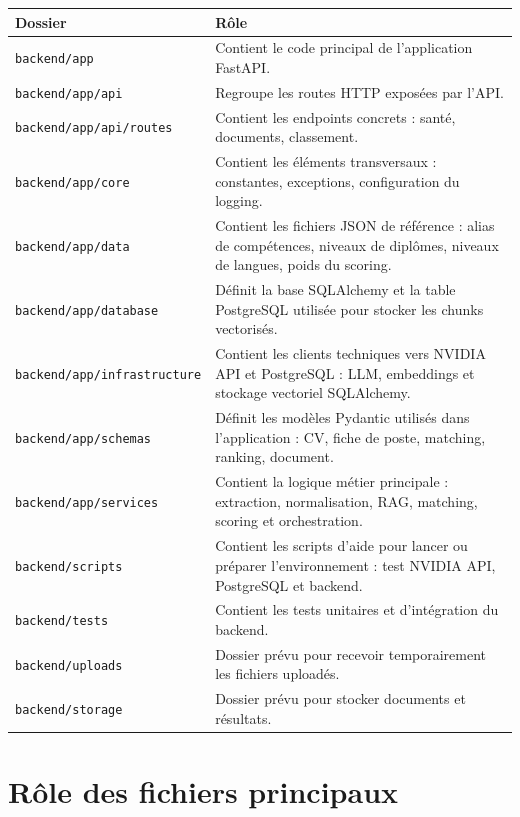 \documentclass[12pt,a4paper]{report}
\begin{document}
\begin{longtable}{|p{4cm}|p{10cm}|}
\hline
\textbf{Dossier} & \textbf{Rôle} \\
\hline
\endhead
\texttt{backend/app} & Contient le code principal de l'application FastAPI. \\
\hline
\texttt{backend/app/api} & Regroupe les routes HTTP exposées par l'API. \\
\hline
\texttt{backend/app/api/routes} & Contient les endpoints concrets : santé, documents, classement. \\
\hline
\texttt{backend/app/core} & Contient les éléments transversaux : constantes, exceptions, configuration du logging. \\
\hline
\texttt{backend/app/data} & Contient les fichiers JSON de référence : alias de compétences, niveaux de diplômes, niveaux de langues, poids du scoring. \\
\hline
\texttt{backend/app/database} & Définit la base SQLAlchemy et la table PostgreSQL utilisée pour stocker les chunks vectorisés. \\
\hline
\texttt{backend/app/infrastructure} & Contient les clients techniques vers NVIDIA API et PostgreSQL : LLM, embeddings et stockage vectoriel SQLAlchemy. \\
\hline
\texttt{backend/app/schemas} & Définit les modèles Pydantic utilisés dans l'application : CV, fiche de poste, matching, ranking, document. \\
\hline
\texttt{backend/app/services} & Contient la logique métier principale : extraction, normalisation, RAG, matching, scoring et orchestration. \\
\hline
\texttt{backend/scripts} & Contient les scripts d'aide pour lancer ou préparer l'environnement : test NVIDIA API, PostgreSQL et backend. \\
\hline
\texttt{backend/tests} & Contient les tests unitaires et d'intégration du backend. \\
\hline
\texttt{backend/uploads} & Dossier prévu pour recevoir temporairement les fichiers uploadés. \\
\hline
\texttt{backend/storage} & Dossier prévu pour stocker documents et résultats. \\
\hline
\end{longtable}

\chapter{Rôle des fichiers principaux}
\end{document}

